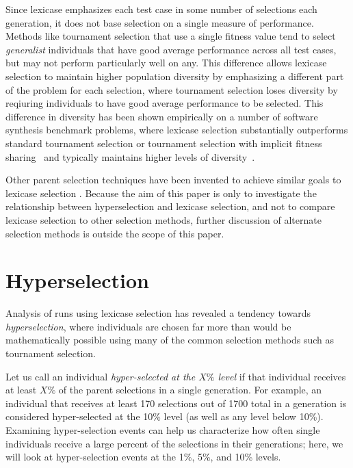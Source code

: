 \documentclass{sig-alternate}
\newcommand{\definition}[1]{\textit{#1}}
\begin{document}
Since lexicase emphasizes each test case in some number of selections each generation, it does not base selection on a single measure of performance. Methods like tournament selection that use a single fitness value tend to select \textit{generalist} individuals that have good average performance across all test cases, but may not perform particularly well on any. This difference allows lexicase selection to maintain higher population diversity by emphasizing a different part of the problem for each selection, where tournament selection loses diversity by reqiuring individuals to have good average performance to be selected. This difference in diversity has been shown empirically on a number of software synthesis benchmark problems, where lexicase selection substantially outperforms standard tournament selection or tournament selection with implicit fitness sharing~\cite{Helmuth:2015:GECCO,Helmuth:2015:dissertation} and typically maintains higher levels of diversity~\cite{Helmuth:2015:GPTP}.

Other parent selection techniques have been invented to achieve similar goals to lexicase selection \cite{Fieldsend:2015:GECCO, Krawiec:ppsn2010, Krawiec:2015:EuroGP, Galvan-Lopez:2013:CEC}. Because the aim of this paper is only to investigate the relationship between hyperselection and lexicase selection, and not to compare lexicase selection to other selection methods, further discussion of alternate selection methods is outside the scope of this paper.


\section{Hyperselection}
\label{section:hyperselection}

Analysis of runs using lexicase selection has revealed a tendency towards \emph{hyperselection}, where individuals are chosen far more than would be mathematically possible using many of the common selection methods such as tournament selection.

Let us call an individual \definition{hyper-selected at the $X\%$ level} if that individual receives at least $X\%$ of the parent selections in a single generation. For example, an individual that receives at least 170 selections out of 1700 total in a generation is considered hyper-selected at the 10\% level (as well as any level below 10\%). Examining hyper-selection events can help us characterize how often single individuals receive a large percent of the selections in their generations; here, we will %
look at hyper-selection events at the 1\%, 5\%, and 10\% levels.
\end{document}
